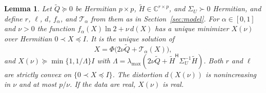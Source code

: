 \documentclass[11pt,onecolumn]{IEEEtran}
\newtheorem{lemma}[theorem]{Lemma}
\newcommand{\C}{\mathbb{C}}
\newcommand{\tQ}{\tilde Q}
\newcommand{\tH}{\tilde H}
\newcommand{\herm}{\mathsf H}
\begin{document}
\begin{lemma}\label{lem:hermitian}
Let $\tQ\succeq0$ be Hermitian $p\times p$, $\tH\in\C^{r\times p}$, and
$\Sigma_U\succ0$ Hermitian, and define $r$, $\ell$, $d$, $f_\alpha$, and
$\mathcal T_\alpha$ from them as in Section~\ref{sec:model}. For
$\alpha\in[0,1]$ and $\nu>0$ the function
$f_\alpha(X)\ln2+\nu\,d(X)$ has a unique minimizer $X(\nu)$ over Hermitian
$0\prec X\preceq I$. It is the unique solution of
\begin{equation}
X=\Phi\bigl(2\nu\tQ+\mathcal T_\alpha(X)\bigr),
\label{eq:fixed}
\end{equation}
and $X(\nu)\succeq\min\{1,1/\Lambda\}I$ with
$\Lambda=\lambda_{\max}(2\nu\tQ+\tH^{\herm}\Sigma_U^{-1}\tH)$. Both $r$ and
$\ell$ are strictly convex on $\{0\prec X\preceq I\}$. The distortion
$d(X(\nu))$ is nonincreasing in $\nu$ and at most $p/\nu$. If the data
are real, $X(\nu)$ is real.
\end{lemma}
\end{document}
